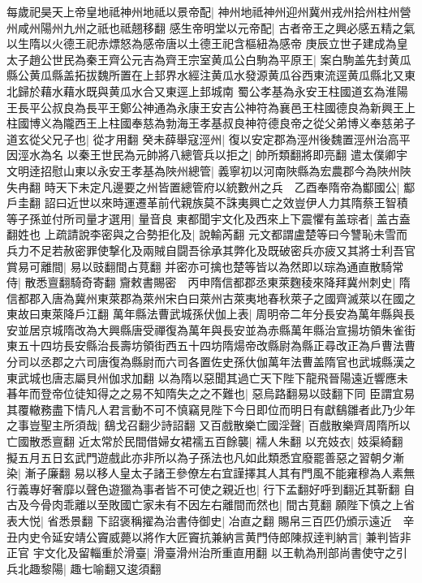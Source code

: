 每歲祀昊天上帝皇地祗神州地祗以景帝配|{
	神州地祗神州迎州冀州戎州拾州柱州營州咸州陽州九州之祇也祗翹移翻}
感生帝明堂以元帝配|{
	古者帝王之興必感五精之氣以生隋以火德王祀赤熛怒為感帝唐以土德王祀含樞紐為感帝}
庚辰立世子建成為皇太子趙公世民為秦王齊公元吉為齊王宗室黄瓜公白駒為平原王|{
	案白駒盖先封黄瓜縣公黄瓜縣盖拓拔魏所置在上邽界水經注黄瓜水發源黄瓜谷西東流逕黄瓜縣北又東北歸於藉水藉水既與黄瓜水合又東逕上邽城南}
蜀公孝基為永安王柱國道玄為淮陽王長平公叔良為長平王鄭公神通為永康王安吉公神符為襄邑王柱國德良為新興王上柱國博义為隴西王上柱國奉慈為勃海王孝基叔良神符德良帝之從父弟博义奉慈弟子道玄從父兄子也|{
	從才用翻}
癸未薛舉寇涇州|{
	復以安定郡為涇州後魏置涇州治高平因涇水為名}
以秦王世民為元帥將八總管兵以拒之|{
	帥所類翻將即亮翻}
遣太僕卿宇文明逹招慰山東以永安王孝基為陜州總管|{
	義寧初以河南陜縣為宏農郡今為陜州陜失冉翻}
時天下未定凡邊要之州皆置總管府以統數州之兵　乙酉奉隋帝為酅國公|{
	酅戶圭翻}
詔曰近世以來時運遷革前代親族莫不誅夷興亡之效豈伊人力其隋蔡王智積等子孫並付所司量才選用|{
	量音良}
東都聞宇文化及西來上下震懼有盖琮者|{
	盖古盍翻姓也}
上疏請說李密與之合勢拒化及|{
	說輸芮翻}
元文都謂盧楚等曰今讐恥未雪而兵力不足若赦密罪使撃化及兩賊自闘吾徐承其弊化及既破密兵亦疲又其將士利吾官賞易可離間|{
	易以豉翻間占莧翻}
并密亦可擒也楚等皆以為然即以琮為通直散騎常侍|{
	散悉亶翻騎奇寄翻}
齎敕書賜密　丙申隋信都郡丞東萊麴稜來降拜冀州刺史|{
	隋信都郡入唐為冀州東萊郡為萊州宋白曰萊州古萊夷地春秋萊子之國齊滅萊以在國之東故曰東萊降戶江翻}
萬年縣法曹武城孫伏伽上表|{
	周明帝二年分長安為萬年縣與長安並居京城隋改為大興縣唐受禪復為萬年與長安並為赤縣萬年縣治宣揚坊領朱雀街東五十四坊長安縣治長壽坊領街西五十四坊隋煬帝改縣尉為縣正尋改正為戶曹法曹分司以丞郡之六司唐復為縣尉而六司各置佐史孫㐲伽萬年法曹盖隋官也武城縣漢之東武城也唐志屬貝州伽求加翻}
以為隋以惡聞其過亡天下陛下龍飛晉陽遠近響應未㫷年而登帝位徒知得之之易不知隋失之之不難也|{
	惡烏路翻易以豉翻下同}
臣謂宜易其覆轍務盡下情凡人君言動不可不慎竊見陛下今日即位而明日有獻鷂雛者此乃少年之事豈聖主所須哉|{
	鷂戈召翻少詩詔翻}
又百戲散樂亡國淫聲|{
	百戲散樂齊周隋所以亡國散悉亶翻}
近太常於民間借婦女裙襦五百餘襲|{
	襦人朱翻}
以充妓衣|{
	妓渠綺翻}
擬五月五日玄武門遊戲此亦非所以為子孫法也凡如此類悉宜廢罷善惡之習朝夕漸染|{
	漸子廉翻}
易以移人皇太子諸王參僚左右宜謹擇其人其有門風不能雍穆為人素無行義專好奢靡以聲色遊獵為事者皆不可使之親近也|{
	行下孟翻好呼到翻近其靳翻}
自古及今骨肉乖離以至敗國亡家未有不因左右離間而然也|{
	間古莧翻}
願陛下慎之上省表大悦|{
	省悉景翻}
下詔褒稱擢為治書侍御史|{
	冶直之翻}
賜帛三百匹仍頒示遠近　辛丑内史令延安靖公竇威薨以將作大匠竇抗兼納言黄門侍郎陳叔逹判納言|{
	兼判皆非正官}
宇文化及留輜重於滑臺|{
	滑臺滑州治所重直用翻}
以王軌為刑部尚書使守之引兵北趣黎陽|{
	趣七喻翻又逡須翻}
